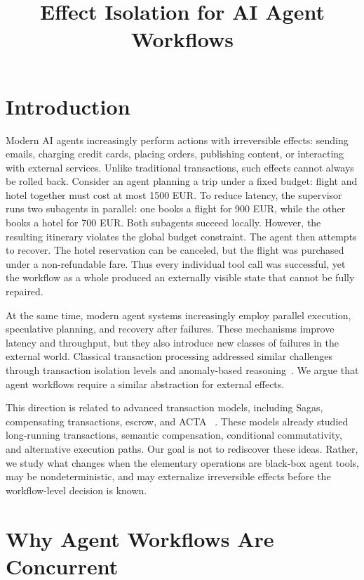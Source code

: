 \documentclass[11pt]{article}
\title{Effect Isolation for AI Agent Workflows}
\author{}
\date{}
\begin{document}
\maketitle

\section{Introduction}

Modern AI agents increasingly perform actions with irreversible effects:
sending emails, charging credit cards, placing orders, publishing content,
or interacting with external services. Unlike traditional transactions,
such effects cannot always be rolled back. Consider an agent planning a trip under a fixed budget: flight and hotel
together must cost at most 1500 EUR. To reduce latency, the supervisor
runs two subagents in parallel: one books a flight for 900 EUR, while the
other books a hotel for 700 EUR. Both subagents succeed locally. However,
the resulting itinerary violates the global budget constraint. The agent then attempts to recover. The hotel reservation can be canceled,
but the flight was purchased under a non-refundable fare. Thus every
individual tool call was successful, yet the workflow as a whole produced
an externally visible state that cannot be fully repaired.

At the same time, modern agent systems increasingly employ
parallel execution, speculative planning, and recovery after
failures. These mechanisms improve latency and throughput, but they also
introduce new classes of failures in the external world. Classical transaction processing addressed similar challenges through
transaction isolation levels and anomaly-based reasoning~\cite{berenson1995critique,adya1999}.
We argue that agent workflows require a similar abstraction for
external effects.

This direction is related to advanced transaction models, including
Sagas, compensating transactions, escrow, and ACTA
~\cite{garcia1987sagas,korth1990formal,oneil1986escrow,chrysanthis1991acta}.
These models already studied long-running transactions, semantic
compensation, conditional commutativity, and alternative execution
paths. Our goal is not to rediscover these ideas. Rather, we study what
changes when the elementary operations are black-box agent tools, may be
nondeterministic, and may externalize irreversible effects before the
workflow-level decision is known.

\section{Why Agent Workflows Are Concurrent}
\end{document}
